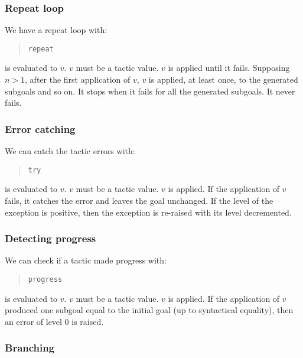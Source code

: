 \subsubsection[Repeat loop]{Repeat loop
}

We have a repeat loop with:
\begin{quote}
{\tt repeat} {\tacexpr}
\end{quote}
{\tacexpr} is evaluated to $v$. $v$ must be a tactic value. $v$ is
applied until it fails. Supposing $n>1$, after the first application
of $v$, $v$ is applied, at least once, to the generated subgoals and
so on. It stops when it fails for all the generated subgoals. It never
fails.

\subsubsection[Error catching]{Error catching
}

We can catch the tactic errors with:
\begin{quote}
{\tt try} {\tacexpr}
\end{quote}
{\tacexpr} is evaluated to $v$. $v$ must be a tactic value. $v$ is
applied. If the application of $v$ fails, it catches the error and
leaves the goal unchanged. If the level of the exception is positive,
then the exception is re-raised with its level decremented.

\subsubsection[Detecting progress]{Detecting progress}

We can check if a tactic made progress with:
\begin{quote}
{\tt progress} {\tacexpr}
\end{quote}
{\tacexpr} is evaluated to $v$. $v$ must be a tactic value. $v$ is
applied. If the application of $v$ produced one subgoal equal to the
initial goal (up to syntactical equality), then an error of level 0 is
raised. 

\ErrMsg {}

\subsubsection[Branching]{Branching\tacindex{$\mid\mid$}
}

